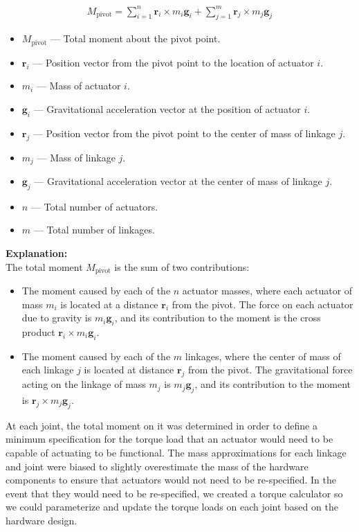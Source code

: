 \documentclass{article}
\begin{document}
\begin{align}
    M_{\text{pivot}} = \sum_{i=1}^{n} \mathbf{r}_i \times m_i \mathbf{g}_i + \sum_{j=1}^{m} \mathbf{r}_j \times m_j \mathbf{g}_j
\end{align}

\begin{itemize}
    \item $M_{\text{pivot}}$ — Total moment about the pivot point.
    \item $\mathbf{r}_i$ — Position vector from the pivot point to the location of actuator $i$.
    \item $m_i$ — Mass of actuator $i$.
    \item $\mathbf{g}_i$ — Gravitational acceleration vector at the position of actuator $i$.
    \item $\mathbf{r}_j$ — Position vector from the pivot point to the center of mass of linkage $j$.
    \item $m_j$ — Mass of linkage $j$.
    \item $\mathbf{g}_j$ — Gravitational acceleration vector at the center of mass of linkage $j$.
    \item $n$ — Total number of actuators.
    \item $m$ — Total number of linkages.
\end{itemize}

\noindent \textbf{Explanation:} \\
The total moment $M_{\text{pivot}}$ is the sum of two contributions: 
\begin{itemize}
    \item The moment caused by each of the $n$ actuator masses, where each actuator of mass $m_i$ is located at a distance $\mathbf{r}_i$ from the pivot. The force on each actuator due to gravity is $m_i \mathbf{g}_i$, and its contribution to the moment is the cross product $\mathbf{r}_i \times m_i \mathbf{g}_i$. 
    \item The moment caused by each of the $m$ linkages, where the center of mass of each linkage $j$ is located at distance $\mathbf{r}_j$ from the pivot. The gravitational force acting on the linkage of mass $m_j$ is $m_j \mathbf{g}_j$, and its contribution to the moment is $\mathbf{r}_j \times m_j \mathbf{g}_j$. 
\end{itemize}

At each joint, the total moment on it was determined in order to define a minimum specification for the torque load that an actuator would need to be capable of actuating to be functional. The mass approximations for each linkage and joint were biased to slightly overestimate the mass of the hardware components to ensure that actuators would not need to be re-specified. In the event that they would need to be re-specified, we created a torque calculator so we could parameterize and update the torque loads on each joint based on the hardware design. 
\end{document}
